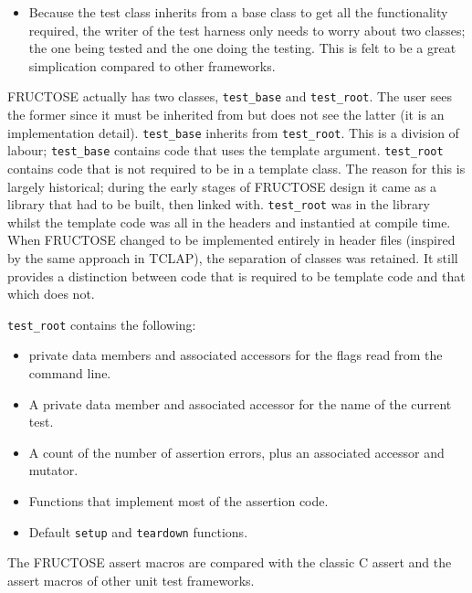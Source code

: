 \documentclass{book}
\begin{document}
\begin{itemize}
\item Because the test class inherits from a base class to get all
the functionality required, the writer of the test harness only needs
to worry about two classes; the one being tested and the one doing the
testing. This is felt to be a great simplication compared to other
frameworks.
\end{itemize}

FRUCTOSE actually has two classes, {\tt test\_base} and {\tt test\_root}.
The user sees the former since it must be inherited from but does not
see the latter (it is an implementation detail).
{\tt test\_base} inherits from {\tt test\_root}.
This is a division of labour; {\tt test\_base} contains code that uses
the template argument. {\tt test\_root} contains code that is not
required to be in a template class. 
The reason for this is largely historical; during the early stages of
FRUCTOSE design it came as a library that had to be built, then linked with.
{\tt test\_root} was in the library whilst the template code was all in the
headers and instantied at compile time. When FRUCTOSE changed to be
implemented entirely in header files (inspired by the same approach in TCLAP),
the separation of classes was retained. It still provides a distinction 
between code that is required to be template code and that which does not.

{\tt test\_root} contains the following:

\begin{itemize}
\item private data members and associated accessors
for the flags read from the command line.

\item A private data member and associated accessor
for the name of the current test.

\item A count of the number of assertion errors, plus
an associated accessor and mutator.

\item Functions that implement most of the assertion code.

\item Default {\tt setup} and {\tt teardown} functions.
\end{itemize}


The FRUCTOSE assert macros are compared with the classic C assert
and the assert macros of other unit test frameworks.
\end{document}
